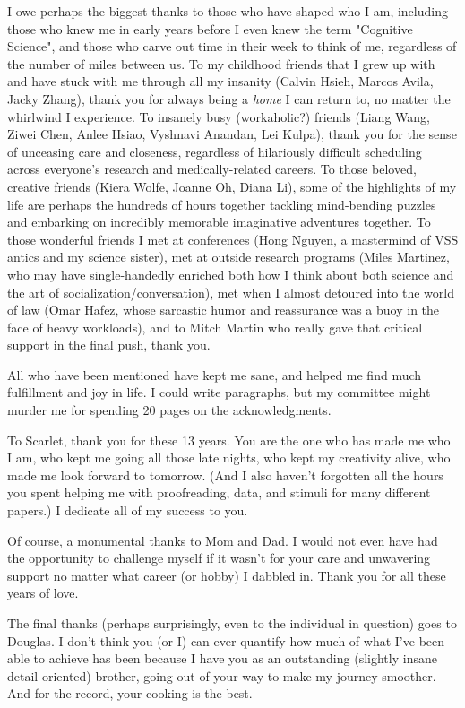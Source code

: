I owe perhaps the biggest thanks to those who have shaped who I am, including those who knew me in early years before I even knew the term "Cognitive Science", and those who carve out time in their week to think of me, regardless of the number of miles between us. To my childhood friends that I grew up with and have stuck with me through all my insanity (Calvin Hsieh, Marcos Avila, Jacky Zhang), thank you for always being a \textit{home} I can return to, no matter the whirlwind I experience.  To insanely busy (workaholic?) friends (Liang Wang, Ziwei Chen, Anlee Hsiao, Vyshnavi Anandan, Lei Kulpa), thank you for the sense of unceasing care and closeness, regardless of hilariously difficult scheduling across everyone's research and medically-related careers. To those beloved, creative friends (Kiera Wolfe, Joanne Oh, Diana Li), some of the highlights of my life are perhaps the hundreds of hours together tackling mind-bending puzzles and embarking on incredibly memorable imaginative adventures together.  To those wonderful friends I met at conferences (Hong Nguyen, a mastermind of VSS antics and my science sister), met at outside research programs (Miles Martinez, who may have single-handedly enriched both how I think about both science and the art of socialization/conversation), met when I almost detoured into the world of law (Omar Hafez, whose sarcastic humor and reassurance was a buoy in the face of heavy workloads), and to Mitch Martin who really gave that critical support in the final push, thank you. 

All who have been mentioned have kept me sane, and helped me find much fulfillment and joy in life. I could write paragraphs, but my committee might murder me for spending 20 pages on the acknowledgments.  

To Scarlet, thank you for these 13 years. You are the one who has made me who I am, who kept me going all those late nights, who kept my creativity alive, who made me look forward to tomorrow.  (And I also haven't forgotten all the hours you spent helping me with proofreading, data, and stimuli for many different papers.) I dedicate all of my success to you. 

Of course, a monumental thanks to Mom and Dad.  I would not even have had the opportunity to challenge myself if it wasn’t for your care and unwavering support no matter what career (or hobby) I dabbled in. Thank you for all these years of love.

The final thanks (perhaps surprisingly, even to the individual in question) goes to Douglas. I don't think you (or I) can ever quantify how much of what I've been able to achieve has been because I have you as an outstanding (slightly insane detail-oriented) brother, going out of your way to make my journey smoother.  And for the record, your cooking is the best.
